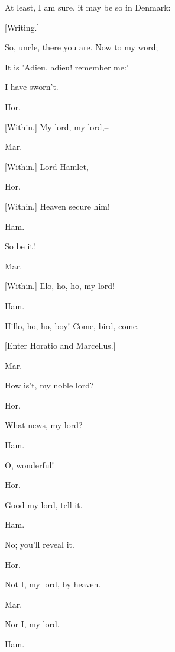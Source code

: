 \documentclass[12pt]{book}
\begin{document}
At least, I am sure, it may be so in Denmark:



[Writing.]



So, uncle, there you are. Now to my word;

It is 'Adieu, adieu! remember me:'

I have sworn't.



Hor.

[Within.] My lord, my lord,--



Mar.

[Within.] Lord Hamlet,--



Hor.

[Within.] Heaven secure him!



Ham.

So be it!



Mar.

[Within.] Illo, ho, ho, my lord!



Ham.

Hillo, ho, ho, boy! Come, bird, come.



[Enter Horatio and Marcellus.]



Mar.

How is't, my noble lord?



Hor.

What news, my lord?



Ham.

O, wonderful!



Hor.

Good my lord, tell it.



Ham.

No; you'll reveal it.



Hor.

Not I, my lord, by heaven.



Mar.

Nor I, my lord.



Ham.
\end{document}
